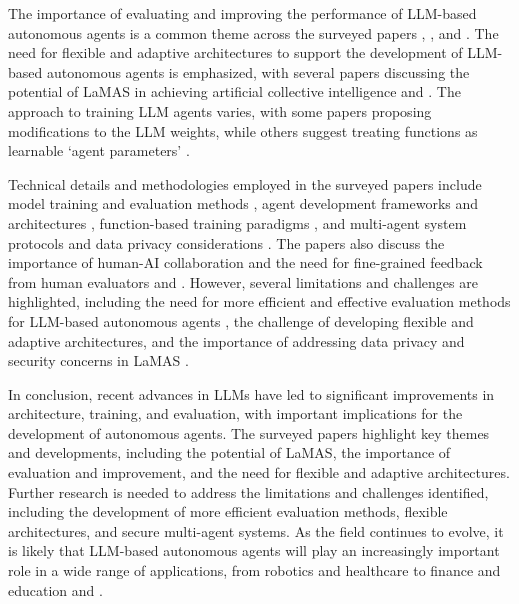 \documentclass[conference]{IEEEtran}
\begin{document}
The importance of evaluating and improving the performance of LLM-based autonomous agents is a common theme across the surveyed papers \cite{2308.03688}, \cite{2406.05804}, and \cite{2412.04093}. The need for flexible and adaptive architectures to support the development of LLM-based autonomous agents is emphasized, with several papers discussing the potential of LaMAS in achieving artificial collective intelligence \cite{2411.14033} and \cite{2402.01680}. The approach to training LLM agents varies, with some papers proposing modifications to the LLM weights, while others suggest treating functions as learnable `agent parameters' \cite{2402.11359}.

Technical details and methodologies employed in the surveyed papers include model training and evaluation methods \cite{2404.04442}, agent development frameworks and architectures \cite{2309.07870}, function-based training paradigms \cite{2402.11359}, and multi-agent system protocols and data privacy considerations \cite{2411.14033}. The papers also discuss the importance of human-AI collaboration and the need for fine-grained feedback from human evaluators \cite{2312.17025} and \cite{2409.02977}. However, several limitations and challenges are highlighted, including the need for more efficient and effective evaluation methods for LLM-based autonomous agents \cite{2406.00936}, the challenge of developing flexible and adaptive architectures, and the importance of addressing data privacy and security concerns in LaMAS \cite{2411.14033}.

In conclusion, recent advances in LLMs have led to significant improvements in architecture, training, and evaluation, with important implications for the development of autonomous agents. The surveyed papers highlight key themes and developments, including the potential of LaMAS, the importance of evaluation and improvement, and the need for flexible and adaptive architectures. Further research is needed to address the limitations and challenges identified, including the development of more efficient evaluation methods, flexible architectures, and secure multi-agent systems. As the field continues to evolve, it is likely that LLM-based autonomous agents will play an increasingly important role in a wide range of applications, from robotics and healthcare to finance and education \cite{2402.02716} and \cite{2411.14033}.
\end{document}
